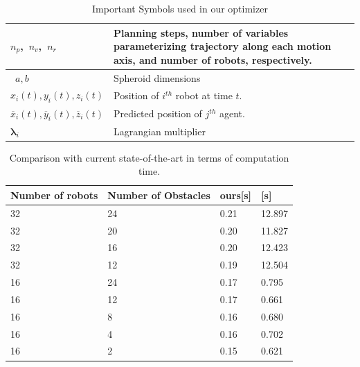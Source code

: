 \begin{table}
\centering
\caption{Important Symbols used in our optimizer} \label{table_1}
\scriptsize
\begin{tabular}{|p{3cm}|p{7cm}|p{7cm}|}\hline
\mbox{$n_{p}$, $n_{v}$, $n_{r}$}  & Planning steps, number of variables parameterizing trajectory along each motion axis, and number of robots, respectively.
\\ \hline
\mbox{ $a, b $} & Spheroid dimensions
\\ \hline
\mbox{$x_i(t), y_i(t), z_i(t)$} & 
 Position of $i^{th}$ robot at time $t$.
\\ \hline
\mbox{$\overline{x}_i(t), \overline{y}_i(t), \overline{z}_i(t)$} & Predicted position of $j^{th}$ agent.
\\ \hline
\mbox{$\boldsymbol{\lambda}_{i}$}
 &  Lagrangian multiplier 
\\ \hline
\end{tabular}
\normalsize
\vspace{-0.7cm}
\end{table}




\begin{table}
\begin{center}
\caption{Comparison with current state-of-the-art \citep{park2020efficient} in terms of computation time.  }
\label{table_comptime_seq}
\begin{tabular}{ |p{3.5cm}|p{3cm}|p{2cm}|p{2cm}|}
\hline
 Number of robots & Number of Obstacles & ours[s] & \citep{park2020efficient}[s]  \\
 \hline
 32 & 24 & 0.21 &  12.897\\
 \hline
 32 & 20 &  0.20 &  11.827\\
 \hline
 32 & 16 & 0.20 & 12.423\\
 \hline
 32 & 12 & 0.19 & 12.504\\
 \hline
 16 & 24 & 0.17 & 0.795\\ 
 \hline
 16 & 12 & 0.17& 0.661\\
 \hline
 16 & 8 & 0.16& 0.680\\
 \hline
 16 & 4 & 0.16 & 0.702\\
 \hline
 16 & 2 & 0.15 & 0.621\\
 \hline
\end{tabular}
\end{center}
\end{table}

